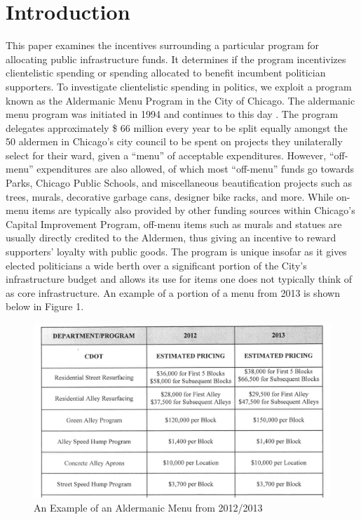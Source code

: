 \section*{Introduction}
This paper examines the incentives surrounding a particular program for allocating public infrastructure funds. It determines if the program incentivizes clientelistic spending or spending allocated to benefit incumbent politician supporters.
To investigate clientelistic spending in politics, we exploit a program known as the Aldermanic Menu Program in the City of Chicago. 
The aldermanic menu program was initiated in 1994 and continues to this day \cite{OIGaudit}. 
The program delegates approximately \$ 66 million every year to be split equally amongst the 50 aldermen in Chicago's city council to be spent on projects they unilaterally select for their ward, given a ``menu'' of acceptable expenditures. 
However, ``off-menu'' expenditures are also allowed, of which most ``off-menu'' funds go towards Parks, Chicago Public Schools, and miscellaneous beautification projects such as trees, murals, decorative garbage cans, designer bike racks, and more\cite{OIGaudit}. 
While on-menu items are typically also provided by other funding sources within Chicago's Capital Improvement Program, off-menu items such as murals and statues are usually directly credited to the Aldermen, thus giving an incentive to reward supporters' loyalty with public goods.
The program is unique insofar as it gives elected politicians a wide berth over a significant portion of the City's infrastructure budget and allows its use for items one does not typically think of as core infrastructure. 
An example of a portion of a menu from 2013 is shown below in Figure 1.


\begin{figure}[H]
    \centering
    \caption{An Example of an Aldermanic Menu from 2012/2013}
    \includegraphics[scale=0.38]{input/menu_example.png}
\end{figure}

